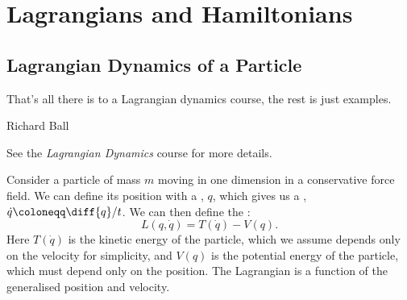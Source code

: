 \documentclass[fleqn]{NotesClass}
\newcommand*{\course}[1]{\textit{#1}}
\newcommand{\lagrangian}{L}
\begin{document}
    \chapter{Lagrangians and Hamiltonians}
    \section{Lagrangian Dynamics of a Particle}
    \epigraph{That's all there is to a Lagrangian dynamics course, the rest is just examples.}{Richard Ball}
    \begin{rmk}
        See the \course{Lagrangian Dynamics} course for more details.
    \end{rmk}
    Consider a particle of mass \(m\) moving in one dimension in a conservative force field.
    We can define its position with a , \(q\), which gives us a , \(\dot{q} \coloneqq \diff{q}/{t}\).
    We can then define the :
    \begin{equation}
        \lagrangian(q, \dot{q}) = T(\dot{q}) - V(q).
    \end{equation}
    Here \(T(\dot{q})\) is the kinetic energy of the particle, which we assume depends only on the velocity for simplicity, and \(V(q)\) is the potential energy of the particle, which must depend only on the position.
    The Lagrangian is a function of the generalised position and velocity.
    
\end{document}
